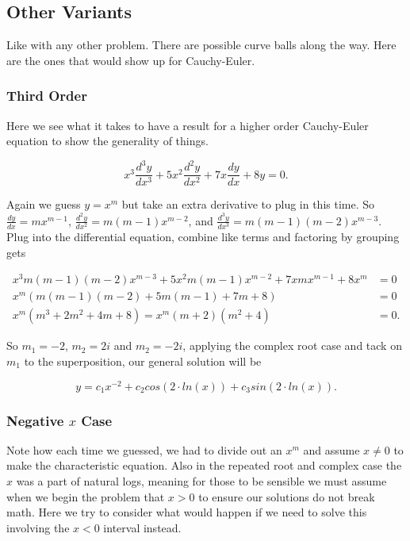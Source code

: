 \documentclass[12pt]{article}
\begin{document}
\subsection{Other Variants}

Like with any other problem. There are possible curve balls along the way. Here are the ones that would show up for Cauchy-Euler.

\subsubsection{Third Order}

Here we see what it takes to have a result for a higher order Cauchy-Euler equation to show the generality of things. 

\begin{equation*}
    x^3\frac{d^3y}{dx^3}+5x^2\frac{d^2y}{dx^2}+7x\frac{dy}{dx}+8y=0.
\end{equation*}

Again we guess $y=x^m$ but take an extra derivative to plug in this time. So $\frac{dy}{dx}=mx^{m-1}$, $\frac{d^2y}{dx^2}=m(m-1)x^{m-2}$, and $\frac{d^3y}{dx^3}=m(m-1)(m-2)x^{m-3}$. Plug into the differential equation, combine like terms and factoring by grouping gets

\begin{align*}
    x^3m(m-1)(m-2)x^{m-3}+5x^2m(m-1)x^{m-2}+7xmx^{m-1}+8x^m &=0 \\
    x^m(m(m-1)(m-2)+5m(m-1)+7m+8) &= 0 \\
    x^m(m^3+2m^2+4m+8) = x^m(m+2)(m^2+4) &= 0.
\end{align*}

So $m_1=-2$, $m_2=2i$ and $m_2=-2i$, applying the complex root case and tack on $m_1$ to the superposition, our general solution will be

\begin{equation*}
    y=c_1x^{-2}+c_2cos(2\cdot ln(x))+c_3sin(2\cdot ln(x)).
\end{equation*}

\subsubsection{Negative $x$ Case}

Note how each time we guessed, we had to divide out an $x^m$ and assume $x\neq0$ to make the characteristic equation. Also in the repeated root and complex case the $x$ was a part of natural logs, meaning for those to be sensible we must assume when we begin the problem that $x>0$ to ensure our solutions do not break math. Here we try to consider what would happen if we need to solve this involving the $x<0$ interval instead. \\
\end{document}
